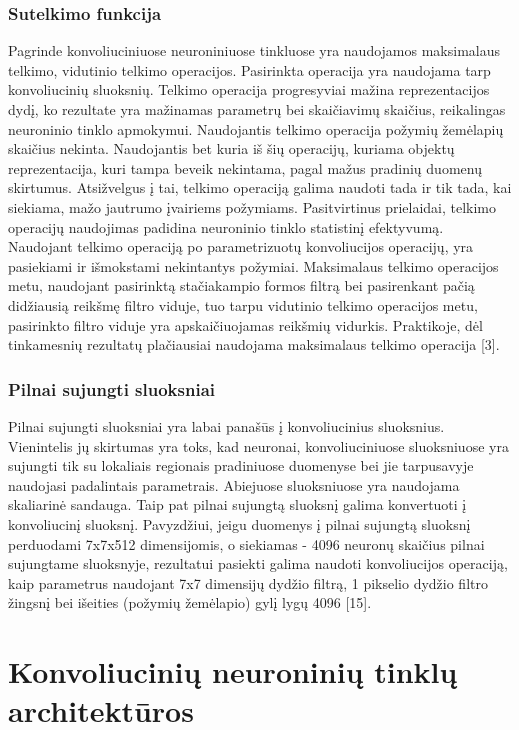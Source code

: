 \documentclass{VUMIFInfBakalaurinis}
\begin{document}
\subsubsection{Sutelkimo funkcija}
Pagrinde konvoliuciniuose neuroniniuose tinkluose yra naudojamos maksimalaus telkimo, vidutinio telkimo operacijos. Pasirinkta operacija yra naudojama tarp konvoliucinių sluoksnių. Telkimo operacija progresyviai mažina reprezentacijos dydį, ko rezultate yra mažinamas parametrų bei skaičiavimų skaičius, reikalingas neuroninio tinklo apmokymui. Naudojantis telkimo operacija požymių žemėlapių skaičius nekinta. Naudojantis bet kuria iš šių operacijų, kuriama objektų reprezentacija, kuri tampa beveik nekintama, pagal mažus pradinių duomenų skirtumus. Atsižvelgus į tai, telkimo operaciją galima naudoti tada ir tik tada, kai siekiama, mažo jautrumo įvairiems požymiams. Pasitvirtinus prielaidai, telkimo operacijų naudojimas padidina neuroninio tinklo statistinį efektyvumą. Naudojant telkimo operaciją po parametrizuotų konvoliucijos operacijų, yra pasiekiami ir išmokstami nekintantys požymiai. Maksimalaus telkimo operacijos metu, naudojant pasirinktą stačiakampio formos filtrą bei pasirenkant pačią didžiausią reikšmę filtro viduje, tuo tarpu vidutinio telkimo operacijos metu, pasirinkto  filtro viduje yra apskaičiuojamas reikšmių vidurkis. Praktikoje, dėl tinkamesnių rezultatų plačiausiai naudojama maksimalaus telkimo operacija [3]. 

\subsubsection{Pilnai sujungti sluoksniai}
Pilnai sujungti sluoksniai yra labai panašūs į konvoliucinius sluoksnius. Vienintelis jų skirtumas yra toks, kad neuronai, konvoliuciniuose sluoksniuose yra sujungti tik su lokaliais regionais pradiniuose duomenyse bei jie tarpusavyje  naudojasi padalintais parametrais. Abiejuose sluoksniuose yra naudojama skaliarinė sandauga. Taip pat pilnai sujungtą sluoksnį galima konvertuoti į konvoliucinį sluoksnį. Pavyzdžiui, jeigu duomenys į pilnai sujungtą sluoksnį perduodami 7x7x512 dimensijomis, o siekiamas - 4096 neuronų skaičius pilnai sujungtame sluoksnyje, rezultatui pasiekti galima naudoti konvoliucijos operaciją, kaip parametrus naudojant 7x7 dimensijų dydžio filtrą, 1 pikselio dydžio filtro žingsnį bei išeities (požymių žemėlapio) gylį lygų 4096 [15]. 

\section{Konvoliucinių neuroninių tinklų architektūros}
\end{document}
